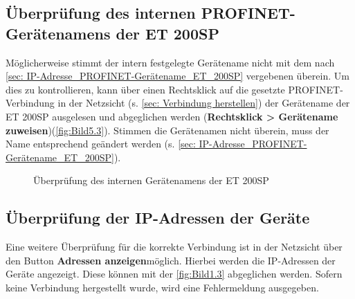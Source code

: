 \subsection{Überprüfung des internen PROFINET-Gerätenamens der ET 200SP}
Möglicherweise stimmt der intern festgelegte Gerätename nicht mit dem nach \autoref{sec: IP-Adresse_PROFINET-Gerätename_ET_200SP} vergebenen überein. Um dies zu kontrollieren, kann über einen Rechtsklick auf die gesetzte PROFINET-Verbindung in der Netzsicht (s. \autoref{sec: Verbindung herstellen}) der Gerätename der ET 200SP ausgelesen und abgeglichen werden (\textbf{Rechtsklick > Gerätename zuweisen})(\autoref{fig:Bild5.3}).  Stimmen die Gerätenamen nicht überein, muss der Name entsprechend geändert werden (s. \autoref{sec: IP-Adresse_PROFINET-Gerätename_ET_200SP}).

\begin{figure}[H]
   \centering
   \caption[Überprüfung des internen Gerätenamens der ET 200SP]{Überprüfung des internen Gerätenamens der ET 200SP}
   \label{fig:Bild5.3}
\end{figure}

\subsection{Überprüfung der IP-Adressen der Geräte}
Eine weitere Überprüfung für die korrekte Verbindung ist in der Netzsicht über den Button \glqq\textbf{Adressen anzeigen}\grqq\:möglich. Hierbei werden die IP-Adressen der Geräte angezeigt. Diese können mit der \autoref{fig:Bild1.3} abgeglichen werden. Sofern keine Verbindung hergestellt wurde, wird eine Fehlermeldung ausgegeben.

